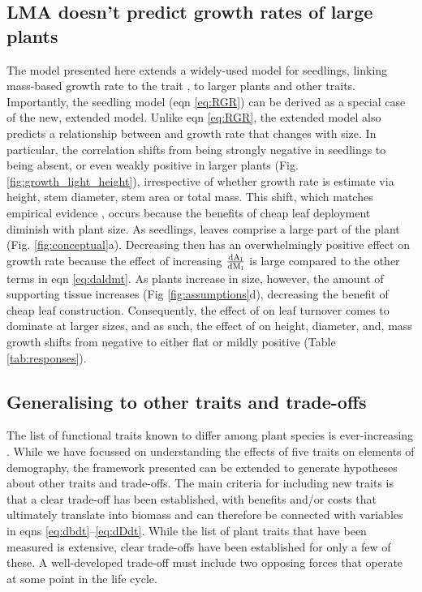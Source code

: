 \documentclass[9pt,twocolumn,twoside,lineno]{pnas-new}
\begin{document}
\subsection{LMA doesn't predict growth rates of large plants}

The model presented here extends a widely-used model for seedlings, linking mass-based growth rate to the trait {\lma} \citep{Lambers-1992, Wright-2000}, to larger plants and other traits. Importantly, the seedling model (eqn \ref{eq:RGR}) can be derived as a special case of the new, extended model. Unlike eqn \ref{eq:RGR}, the extended model also predicts a relationship between {\lma} and growth rate that changes with size. In particular, the correlation shifts from being strongly negative in seedlings to being absent, or even weakly positive in larger plants (Fig. \ref{fig:growth_light_height}), irrespective of whether growth rate is estimate via height, stem diameter, stem area or total mass. This shift, which matches empirical evidence \citep{Poorter-2008, Wright-2010, Herault-2011, Paine-2015, Gibert-2016}, occurs because the benefits of cheap leaf deployment diminish with plant size. As seedlings, leaves comprise a large part of the plant (Fig. \ref{fig:conceptual}a). Decreasing {\lma} then has an overwhelmingly positive effect on growth rate because the effect of increasing $\frac{\rm{d} A_{\rm l}}{\rm{d} M_{\rm l}}$ is large compared to the other terms in eqn \ref{eq:daldmt}. As plants increase in size, however, the amount of supporting tissue increases (Fig \ref{fig:assumptions}d), decreasing the benefit of cheap leaf construction. Consequently, the effect of {\lma} on leaf turnover comes to dominate at larger sizes, and as such, the effect of {\lma} on height, diameter, and, mass growth shifts from negative to either flat or mildly positive  (Table \ref{tab:responses}).


\subsection{Generalising to other traits and trade-offs}

The list of functional traits known to differ among plant species is ever-increasing \citep{Perez-2013}. While we have focussed on understanding the effects of five traits on elements of demography, the framework presented can be extended to generate hypotheses about other traits and trade-offs. The main criteria for including new traits is that a clear trade-off has been established, with benefits and/or costs that ultimately translate into biomass and can therefore be connected with variables in eqns \ref{eq:dbdt}--\ref{eq:dDdt}. While the list of plant traits that have been measured is extensive, clear trade-offs have been established for only a few of these. A well-developed trade-off must include two opposing forces that operate at some point in the life cycle.
\end{document}
